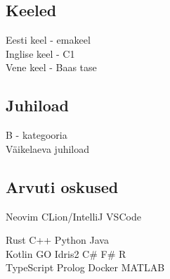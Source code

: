\documentclass[]{deedy-resume-openfont}
\begin{document}
\begin{minipage}[t]{0.33\textwidth}
\subsection{Keeled}

Eesti keel - emakeel \\
Inglise keel - C1 \\
Vene keel - Baas tase \\

\sectionspace %


\subsection{Juhiload}

B - kategooria \\
Väikelaeva juhiload \\

\sectionspace %

\subsection{Arvuti oskused}

Neovim \textbullet{} CLion/IntelliJ \textbullet{} VSCode \\

\sectionspace

Rust \textbullet{} C++ \textbullet{} Python \textbullet{} Java \\
Kotlin \textbullet{} GO \textbullet{} Idris2 \textbullet{} C\# \textbullet{} F\# \textbullet{} R \\
TypeScript \textbullet{} Prolog \textbullet{} Docker \textbullet{} MATLAB


\sectionspace %


\end{minipage} %
\hfill
%
%
\end{document}
